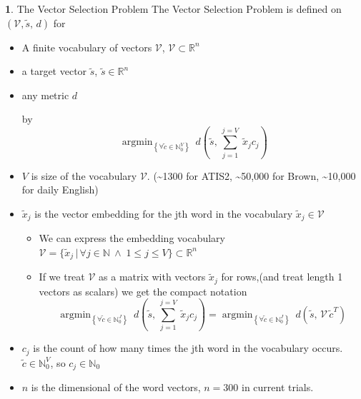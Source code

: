 \documentclass[11pt]{article}
\numberwithin{equation}{section}
\numberwithin{figure}{section}
\theoremstyle{plain}
\theoremstyle{definition}
\newtheorem{defn}[thm]{\protect\definitionname}
\providecommand{\definitionname}{Definition}
\DeclareMathOperator*{\argmin}{argmin}
\begin{document}
\renewcommand{\c}{\tilde{c}}
\newcommand{\s}{\tilde{s}}
\newcommand{\x}{\tilde{x}}
\renewcommand{\t}{\tilde{t}}
\newcommand{\N}{\mathbb{N}}
\newcommand{\R}{\mathbb{R}}
\newcommand{\V}{\mathcal{V}}

\begin{defn}{The Vector Selection Problem}
	The Vector Selection Problem is defined on $(\V, \s,\,d)$ for
	\begin{itemize}
		\item A finite vocabulary of vectors $\V$, $\V\subset{\R}^{n}$
		\item a target vector $ \s$, $ \s\in\R^{n}$
		\item any metric $d$ 
		
		by
		\[
		\argmin_{\left\{ \forall\c\in\N_{0}^{V}\right\} }\:d( \s,\,\sum_{j=1}^{j=V}\:\x_{j}c_{j})
		\]
		
		\medskip{}
				
		\item $V$ is size of the vocabulary $\V$. (\textasciitilde{}1300
		for ATIS2, \textasciitilde{}50,000 for Brown, \textasciitilde{}10,000
		for daily English) 
		\item $\x_{j}$ is the vector embedding for the jth word in the vocabulary
		$\x_{j}\in\V$ 
		
		\begin{itemize}
			\item We can express the embedding vocabulary $\V=\{\x_{j}\,|\,\forall j\in\N\:\wedge\;1\le j\le V\}\subset\R^{n}$
			\item If we treat $\V$ as a matrix with vectors $\x_{j}$
			for rows,(and treat length 1 vectors as scalars) we get the compact
			notation 
			\[
			\argmin_{\left\{ \forall\tilde{c}\in\N_{0}^{J}\right\} }\:d(\s,\,\sum_{j=1}^{j=V}\:\x_{j}c_{j})=\argmin_{\left\{ \forall\tilde{c}\in\N_{0}^{J}\right\} }\:d(\s,\,\V\,\c^{T})
			\]
			
		\end{itemize}
		\item $c_{j}$ is the count of how many times the jth word in the vocabulary
		occurs. $\c\in\N_{0}^{V}$, so $c_{j}\in\N_{0}$
		\item $n$ is the dimensional of the word vectors, $n=300$ in current trials. \end{itemize}
\end{defn}
\end{document}
